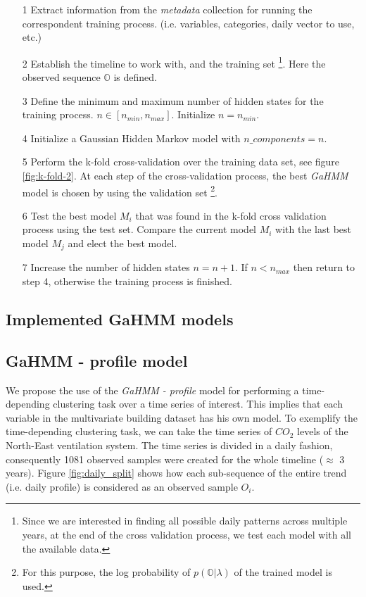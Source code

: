 \begin{itemize}
\item[1] Extract information from the \textit{metadata} collection for running the correspondent training process. (i.e. variables, categories, daily vector to use, etc.)
\item[2] Establish the timeline to work with, and the training set \footnote{Since we are interested in finding all possible daily patterns across multiple years, at the end of the cross validation process, we test each model with all the available data.}. Here the observed sequence $\mathbb{O}$ is defined.   
\item[3] Define the minimum and maximum number of hidden states for the training process. $n \in [n_{min}, n_{max}]$. Initialize $n= n_{min}$.
\item[4] Initialize a Gaussian Hidden Markov model with $n\_components = n$.
\item[5] Perform the k-fold cross-validation over the training data set, see figure \ref{fig:k-fold-2}. At each step of the cross-validation process, the best \textit{GaHMM} model is chosen by using the validation set \footnote{For this purpose, the log probability of $p(\mathbb{O}|\lambda)$ of the trained model is used.}. 
\item[6] Test the best model $M_i$ that was found in the k-fold cross validation process using the test set. Compare the current model $M_i$ with the last best model $M_j$ and elect the best model.
\item[7] Increase the number of hidden states $n = n+1$. If $n<n_{max}$ then return to step 4, otherwise the training process is finished.  
\end{itemize} 

\subsection{Implemented GaHMM models}
\label{implemented}
\subsection{GaHMM - profile model}
\label{sec:profile_model}

We propose the use of the \textit{GaHMM - profile} model for performing a time-depending clustering task over a time series of interest. This implies that each variable in the multivariate building dataset has his own model. To exemplify the time-depending clustering task, we can take the time series of $CO_2$ levels of the North-East ventilation system. The time series is divided in a daily fashion, consequently 1081 observed samples were created for the whole timeline ($\approx$ 3 years). Figure \ref{fig:daily_split} shows how each sub-sequence of the entire trend (i.e. daily profile) is considered as an observed sample $O_i$.      


